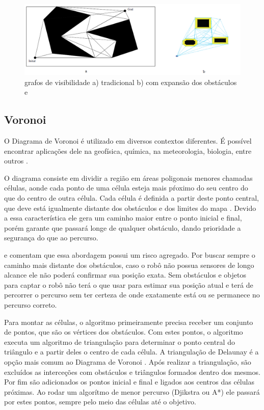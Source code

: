 \begin{figure}[h]
	\centering
	\label{fig08}
		\includegraphics[keepaspectratio=true,scale=0.6]{figuras/7visibilityGraph.png}
	\caption{grafos de visibilidade a) tradicional b) com expansão dos obstáculos \cite{Thomsen2010} e \cite{MRIT_SITE}}
\end{figure}

\subsection{Voronoi}

O Diagrama de Voronoi é utilizado em diversos contextos diferentes. É possível encontrar aplicações dele na geofísica, química, na meteorologia, biologia, entre outros \cite{VORONOI_SITE}.

O diagrama consiste em dividir a região em áreas poligonais menores chamadas células, aonde cada ponto de uma célula esteja mais pŕoximo do seu centro do que do centro de outra célula. Cada célula é definida a partir deste ponto central, que deve está igualmente distante dos obstáculos e dos limites do mapa \cite{Guzman2008}. Devido a essa característica ele gera um caminho maior entre o ponto inicial e final, porém garante que passará longe de qualquer obstáculo, dando prioridade a segurança do que ao percurso.

\cite{Siegwart2004} e \cite{Choset2005} comentam que essa abordagem possui um risco agregado. Por buscar sempre o caminho mais distante dos obstáculos, caso o robô não possua sensores de longo alcance ele não poderá confirmar sua posição exata. Sem obstáculos e objetos para captar o robô não terá o que usar para estimar sua posição atual e terá de percorrer o percurso sem ter certeza de onde exatamente está ou se permanece no percurso correto.

Para montar as células, o algoritmo primeiramente precisa receber um conjunto de pontos, que são os vértices dos obstáculos. Com estes pontos, o algoritmo executa um algoritmo de triangulação para determinar o ponto central do triângulo e a partir deles o centro de cada célula. A triangulação de Delaunay é a opção mais comum ao Diagrama de Voronoi \cite{Souza2008}. Após realizar a triangulação, são excluídos as interceções com obstáculos e triângulos formados dentro dos mesmos. Por fim são adicionados os pontos inicial e final e ligados aos centros das células próximas. Ao rodar um algorítmo de menor percurso (Djikstra ou A*) ele passará por estes pontos, sempre pelo meio das células até o objetivo.

